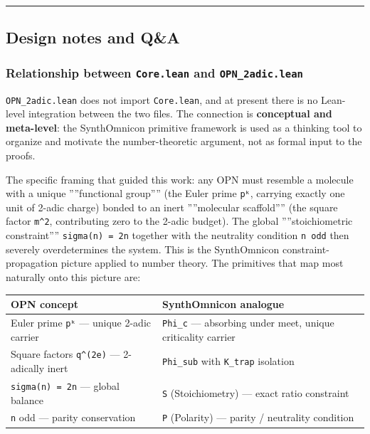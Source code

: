 \documentclass[10pt,a4paper]{article}
\begin{document}
\begin{center}
\rule{0.5\textwidth}{0.4pt}
\end{center}

\subsection{Design notes and Q\&A}

\subsubsection{Relationship between \texttt{Core.lean} and \texttt{OPN\_2adic.lean}}

\texttt{OPN\_2adic.lean} does not import \texttt{Core.lean}, and at present there is no Lean-level integration
between the two files. The connection is \textbf{conceptual and meta-level}: the SynthOmnicon
primitive framework is used as a thinking tool to organize and motivate the number-theoretic
argument, not as formal input to the proofs.

The specific framing that guided this work: any OPN must resemble a molecule with a unique
''''functional group'''' (the Euler prime \texttt{pᵏ}, carrying exactly one unit of 2-adic charge) bonded to
an inert ''''molecular scaffold'''' (the square factor \texttt{m\^{}2}, contributing zero to the 2-adic budget).
The global ''''stoichiometric constraint'''' \texttt{sigma(n) = 2n} together with the neutrality condition \texttt{n odd}
then severely overdetermines the system. This is the SynthOmnicon constraint-propagation picture
applied to number theory. The primitives that map most naturally onto this picture are:

\begin{table}[htbp]
\centering
\small
{}
\begin{tabularx}{\textwidth}{>{\centering\arraybackslash}X >{\centering\arraybackslash}X}
\toprule
\rowcolor{gray!25}\textbf{OPN concept} & \textbf{SynthOmnicon analogue} \\
\midrule
\rowcolors{1}{white}{gray!10}
Euler prime \texttt{pᵏ} --- unique 2-adic carrier & \texttt{Phi\_c} --- absorbing under meet, unique criticality carrier \\
Square factors \texttt{q\^{}(2e)} --- 2-adically inert & \texttt{Phi\_sub} with \texttt{K\_trap} isolation \\
\texttt{sigma(n) = 2n} --- global balance & \texttt{S} (Stoichiometry) --- exact ratio constraint \\
\texttt{n} odd --- parity conservation & \texttt{P} (Polarity) --- parity / neutrality condition \\
\bottomrule
\end{tabularx}
\end{table}
\end{document}
